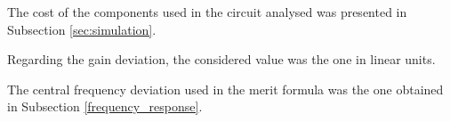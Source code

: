 \par The cost of the components used in the circuit analysed was presented in Subsection \ref{sec:simulation}.
\par Regarding the gain deviation, the considered value was the one in linear units.
\par The central frequency deviation used in the merit formula was the one obtained in Subsection \ref{frequency_response}.
